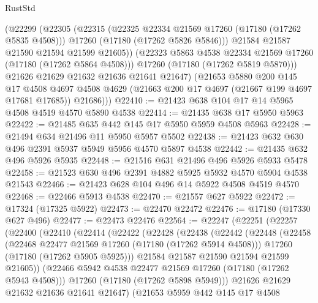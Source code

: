 \begin{lexlean}{RustStd}
\begin{coremodule}
{\begin{coremodule}
{{{{{{{{{{{{{{{{{{{{{{{{{{{{{{{{{{{{{{{{{{{{{{{{{{{{{{{            (@22299
              (@22305
                (@22315
                  (@22325 @22334 @21569 @17260 (@17180 (@17262 @5835 @4508)))
                  @17260
                  (@17180 (@17262 @5826 @5846)))
                @21584
                @21587
                @21590
                @21594
                @21599
                @21605))
            (@22323 @5863 @4538 @22334 @21569 @17260 (@17180 (@17262 @5864 @4508)))
            @17260
            (@17180 (@17262 @5819 @5870)))
          @21626
          @21629
          @21632
          @21636
          @21641
          @21647)
        (@21653
          @5880
          @200
          @145
          @17
          @4508
          @4697
          @4508
          @4629
          (@21663 @200 @17 @4697 (@21667 @199 @4697 @17681 @17685))
          @21686)))
@22410 := @21423 @638 @104 @17 @14 @5965 @4508 @4519 @4570 @5890 @4538
@22414 := @21435 @638 @17 @5950 @5963
@22422 := @21485 @635 @442 @145 @17 @5950 @5959 @4508 @5963
@22428 := @21494 @634 @21496 @11 @5950 @5957 @5502
@22438 := @21423 @632 @630 @496 @2391 @5937 @5949 @5956 @4570 @5897 @4538
@22442 := @21435 @632 @496 @5926 @5935
@22448 := @21516 @631 @21496 @496 @5926 @5933 @5478
@22458 := @21523 @630 @496 @2391 @4882 @5925 @5932 @4570 @5904 @4538 @21543
@22466 := @21423 @628 @104 @496 @14 @5922 @4508 @4519 @4570
@22468 := @22466 @5913 @4538
@22470 := @21557 @627 @5922
@22472 := @17324 (@17325 @5922)
@22473 := @22470 @22472
@22476 := @17180 (@17330 @627 @496)
@22477 := @22473 @22476
@22564 := @22247
    (@22251
      (@22257
        (@22400
          (@22410
            (@22414
              (@22422
                (@22428
                  (@22438
                    (@22442
                      (@22448
                        (@22458
                          (@22468 @22477 @21569 @17260 (@17180 (@17262 @5914 @4508)))
                          @17260
                          (@17180 (@17262 @5905 @5925)))
                        @21584
                        @21587
                        @21590
                        @21594
                        @21599
                        @21605))
                    (@22466 @5942 @4538 @22477 @21569 @17260 (@17180 (@17262 @5943 @4508)))
                    @17260
                    (@17180 (@17262 @5898 @5949)))
                  @21626
                  @21629
                  @21632
                  @21636
                  @21641
                  @21647)
                (@21653
                  @5959
                  @442
                  @145
                  @17
                  @4508
}}}}}}}}}}}}}}}}}}}}}}}}}}}}}}}}}}}}}}}}}}}}}}}}}}}}}}}
\end{coremodule}}
\end{coremodule}
\end{lexlean}

